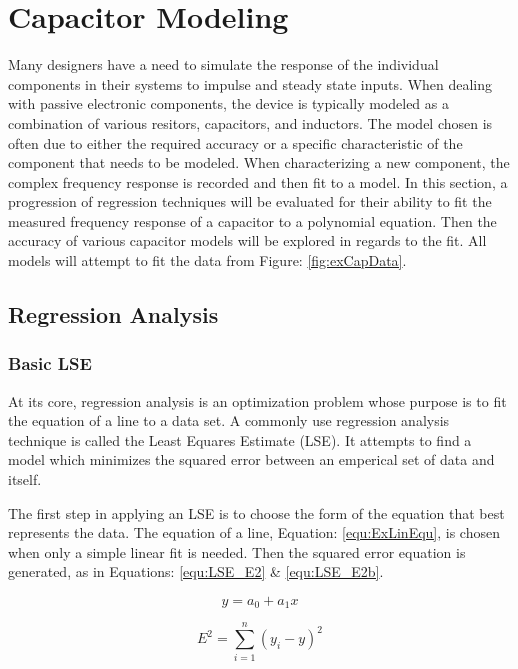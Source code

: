 \section {Capacitor Modeling}

Many designers have a need to simulate the response of the individual components in their systems to impulse and steady state inputs. When dealing with passive electronic components, the device is typically modeled as a combination of various resitors, capacitors, and inductors. The model chosen is often due to either the required accuracy or a specific characteristic of the component that needs to be modeled. When characterizing a new component, the complex frequency response is recorded and then fit to a model. In this section, a progression of regression techniques will be evaluated for their ability to fit the measured frequency response of a capacitor to a polynomial equation. Then the accuracy of various capacitor models will be explored in regards to the fit. All models will attempt to fit the data from Figure: \ref{fig:exCapData}.




\subsection{Regression Analysis}
\label{sec:RegressionAnalysis}
\subsubsection{Basic LSE}
At its core, regression analysis is an optimization problem whose purpose is to fit the equation of a line to a data set. A commonly use regression analysis technique is called the Least Equares Estimate (LSE). It attempts to find a model which minimizes the squared error between an emperical set of data and itself.

The first step in applying an LSE is to choose the form of the equation that best represents the data. The equation of a line, Equation: \eqref{equ:ExLinEqu}, is chosen when only a simple linear fit is needed.
Then the squared error equation is generated, as in Equations: \eqref{equ:LSE_E2} \& \eqref{equ:LSE_E2b}.

\begin{equation}
    \label{equ:ExLinEqu}
    y = a_0 + a_1 x
\end{equation}

\begin{equation}
    \label{equ:LSE_E2}
    E^2 = \sum_{i=1}^{n} (y_i - y)^2
\end{equation}

